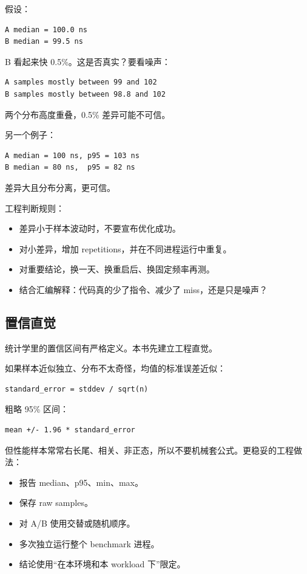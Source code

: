 假设：

\begin{lstlisting}
A median = 100.0 ns
B median = 99.5 ns
\end{lstlisting}

B 看起来快 0.5\%。这是否真实？要看噪声：

\begin{lstlisting}
A samples mostly between 99 and 102
B samples mostly between 98.8 and 102
\end{lstlisting}

两个分布高度重叠，0.5\% 差异可能不可信。

另一个例子：

\begin{lstlisting}
A median = 100 ns, p95 = 103 ns
B median = 80 ns,  p95 = 82 ns
\end{lstlisting}

差异大且分布分离，更可信。

工程判断规则：

\begin{itemize}
  \item 差异小于样本波动时，不要宣布优化成功。
  \item 对小差异，增加 repetitions，并在不同进程运行中重复。
  \item 对重要结论，换一天、换重启后、换固定频率再测。
  \item 结合汇编解释：代码真的少了指令、减少了 miss，还是只是噪声？
\end{itemize}

\subsection{置信直觉}

统计学里的置信区间有严格定义。本书先建立工程直觉。

如果样本近似独立、分布不太奇怪，均值的标准误差近似：

\begin{lstlisting}
standard_error = stddev / sqrt(n)
\end{lstlisting}

粗略 95\% 区间：

\begin{lstlisting}
mean +/- 1.96 * standard_error
\end{lstlisting}

但性能样本常常右长尾、相关、非正态，所以不要机械套公式。更稳妥的工程做法：

\begin{itemize}
  \item 报告 median、p95、min、max。
  \item 保存 raw samples。
  \item 对 A/B 使用交替或随机顺序。
  \item 多次独立运行整个 benchmark 进程。
  \item 结论使用“在本环境和本 workload 下”限定。
\end{itemize}


